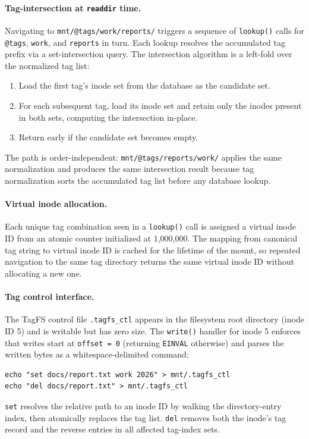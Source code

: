 \documentclass[5p,times]{elsarticle}
\begin{document}
\paragraph{Tag-intersection at \texttt{readdir} time.}
Navigating to \texttt{mnt/@tags/work/\allowbreak{}reports/} triggers a sequence of
\texttt{lookup()} calls for \texttt{@tags}, \texttt{work}, and
\texttt{reports} in turn.  Each lookup resolves the accumulated tag prefix
via a set-intersection query.  The intersection algorithm is a left-fold
over the normalized tag list:
\begin{enumerate}
\item Load the first tag's inode set from the database as the candidate set.
\item For each subsequent tag, load its inode set and retain only the
  inodes present in both sets, computing the intersection in-place.
\item Return early if the candidate set becomes empty.
\end{enumerate}
The path is order-independent: \texttt{mnt/@tags/reports/work/}
applies the same normalization and produces the same intersection result
because tag normalization sorts the accumulated tag list before any
database lookup.

\paragraph{Virtual inode allocation.}
Each unique tag combination seen in a \texttt{lookup()} call is assigned
a virtual inode ID from an atomic counter initialized at 1,000,000.  The
mapping from canonical tag string to virtual inode ID is cached for the
lifetime of the mount, so repeated navigation to the same tag directory
returns the same virtual inode ID without allocating a new one.

\paragraph{Tag control interface.}
The TagFS control file \texttt{.tagfs\_ctl} appears in the filesystem
root directory (inode ID 5) and is writable but has zero size.  The
\texttt{write()} handler for inode 5 enforces that writes start at
\texttt{offset = 0} (returning \texttt{EINVAL} otherwise) and parses
the written bytes as a whitespace-delimited command:
\begin{verbatim}
echo "set docs/report.txt work 2026" > mnt/.tagfs_ctl
echo "del docs/report.txt" > mnt/.tagfs_ctl
\end{verbatim}
\texttt{set} resolves the relative path to an inode ID by walking the
directory-entry index, then atomically replaces the tag list.
\texttt{del} removes both the inode's tag record and the reverse entries
in all affected tag-index sets.
\end{document}
